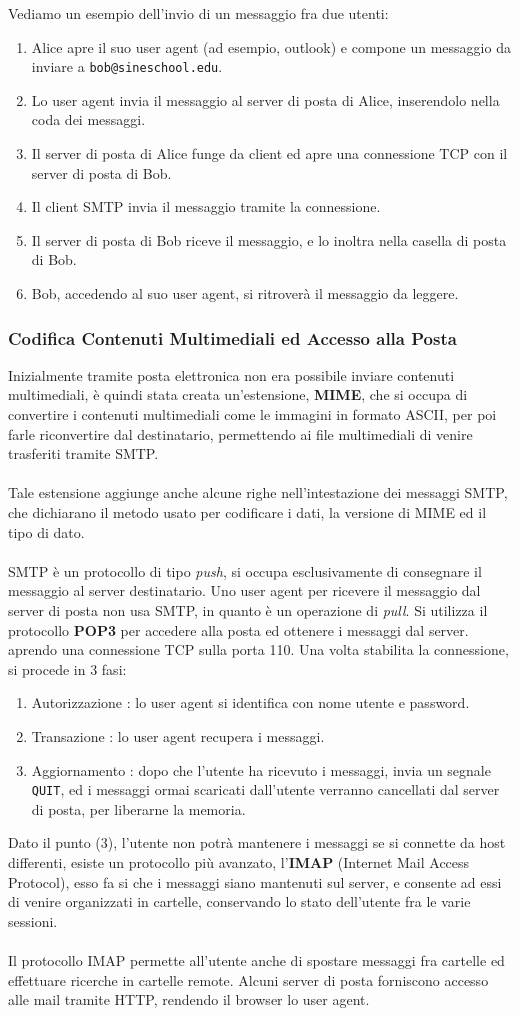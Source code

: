 \documentclass[12pt, letterpaper]{article}
\newcommand{\code}[1]{\colorbox{light-gray}{\texttt{#1}}}
\newcommand{\acc}{\\\hphantom{}\\}
\begin{document}
Vediamo un esempio dell'invio di un messaggio fra due utenti:\begin{enumerate}
    \item Alice apre il suo user agent (ad esempio, outlook) e compone un messaggio da
          inviare a \code{bob@sineschool.edu}.
    \item Lo user agent invia il messaggio al server di posta di Alice, inserendolo nella coda dei messaggi.
    \item Il server di posta di Alice funge da client ed apre una connessione TCP con il server di posta
          di Bob.
    \item Il client SMTP invia il messaggio tramite la connessione.
    \item Il server di posta di Bob riceve il messaggio, e lo inoltra nella casella di posta di Bob.
    \item Bob, accedendo al suo user agent, si ritroverà il messaggio da leggere.
\end{enumerate}
\subsubsection{Codifica Contenuti Multimediali ed Accesso alla Posta}
Inizialmente tramite posta elettronica non era possibile inviare contenuti multimediali, è quindi stata creata
un'estensione, \textbf{MIME}, che si occupa di convertire i contenuti multimediali come le immagini in
formato ASCII, per poi farle riconvertire dal destinatario, permettendo ai file multimediali di venire
trasferiti tramite SMTP.\acc
Tale estensione aggiunge anche alcune righe nell'intestazione dei messaggi SMTP, che dichiarano il
metodo usato per codificare i dati, la versione di MIME ed il tipo di dato.\acc
SMTP è un protocollo di tipo \textit{push}, si occupa esclusivamente di consegnare il messaggio
al server destinatario. Uno user agent per ricevere il messaggio dal server di posta non usa SMTP, in
quanto è un operazione di \textit{pull}. Si utilizza il protocollo \textbf{POP3} per accedere alla posta
ed ottenere i messaggi dal server. aprendo una connessione TCP sulla porta 110. Una volta stabilita la
connessione, si procede in 3 fasi:\begin{enumerate}
    \item Autorizzazione : lo user agent si identifica con nome utente e password.
    \item Transazione : lo user agent recupera i messaggi.
    \item Aggiornamento : dopo che l'utente ha ricevuto i messaggi, invia un segnale \code{QUIT}, ed i
          messaggi ormai scaricati dall'utente verranno cancellati dal server di posta, per liberarne
          la memoria.
\end{enumerate}
Dato il punto (3), l'utente non potrà mantenere i messaggi se si connette da host differenti,
esiste un protocollo più avanzato, l'\textbf{IMAP} (Internet Mail Access Protocol), esso fa si che i messaggi
siano mantenuti sul server, e consente ad essi di venire organizzati in cartelle, conservando lo stato
dell'utente fra le varie sessioni.\acc Il protocollo IMAP permette all'utente anche di spostare messaggi
fra cartelle ed effettuare ricerche in cartelle remote. Alcuni server di posta forniscono accesso alle mail
tramite HTTP, rendendo il browser lo user agent.
\end{document}
